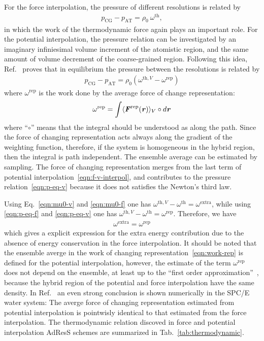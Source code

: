 \documentclass[epjST]{svjour}
\newcommand{\vect}[1]{\textbf{\textit{#1}}}
\newcommand{\AT}[0]{\textrm{AT}}
\newcommand{\CG}[0]{\textrm{CG}}
\newcommand{\thf}{{\textrm{th}}}
\newcommand{\rep}{{\textrm{rep}}}
\newcommand{\exc}{{\textrm{extra}}}
\begin{document}
For the force interpolation, the pressure of different resolutions
is related by~\cite{fritsch2012adaptive}
\begin{align}\label{eqn:p-eq-f}
  p_\CG - p_\AT = \rho_0 \:\omega^{\thf},
\end{align}
in which the work of the thermodynamic force again plays an important
role.  For the potential interpolation, the pressure relation can be
investigated by an imaginary infiniesimal volume increment of the atomistic
region, and the same amount of volume decrement of the coarse-grained
region. Following this idea, Ref.~\cite{agarwal2014chemical} proves that in
equilibrium the pressure between the resolutions is related by
\begin{align}\label{eqn:p-eq-v}
  p_\CG - p_\AT = \rho_0 (\omega^{\thf,V} - \omega^\rep)  
\end{align}
where $\omega^\rep$ is the work done by the average force of change representation:
\begin{align}\label{eqn:work-rep}
  \omega^\rep = \int \langle \vect F^\rep(\vect r)\rangle_V\circ d\vect r
\end{align}
where ``$\circ$'' means that the integral should be understood as along the path.
Since the force of changing representation acts always along the gradient of the weighting
function, therefore, if the system is homogeneous in the hybrid region, then the integral
is path independent. The ensemble average  can be estimated by sampling.
The force of changing representation merges from the last term of potential
interpolation~\eqref{eqn:f-v-interpol}, and contributes to the
pressure relation~\eqref{eqn:p-eq-v} because it does not satisfies the Newton's third
law.

Using Eq.~\eqref{eqn:mu0-v} and \eqref{eqn:mu0-f} one has $\omega^{\thf,V} - \omega^\thf = \omega^\exc$,
while using \eqref{eqn:p-eq-f} and \eqref{eqn:p-eq-v} one has $\omega^{\thf,V} - \omega^\thf = \omega^\rep$.
Therefore, we have 
\begin{align}
  \omega^\exc = \omega^\rep
\end{align}
which gives a explicit expression for the extra energy contribution
due to the absence of energy conservation in the force
interpolation. It should be noted that the ensemble averge in the work
of changing representation~\eqref{eqn:work-rep} is defined for the
potential interpolation, however, the estimate of the term
$\omega^\rep$ does not depend on the ensemble, at least up to the
``first order approximation''~\cite{agarwal2014chemical}, because the
hybrid region of the potential and force interpolation have the same
density. In Ref.~\cite{wang2013grand} an even strong conclusion is shown numerically in the SPC/E water system: The
averge force of changing representation estimated from potential
interpolation is pointwisly identical to that estimated from the force
interpolation. The thermodynamic relation discoved in
force and potential interpolation AdResS schemes are summarized
in Tab.~\ref{tab:thermodynamic}.
\end{document}

